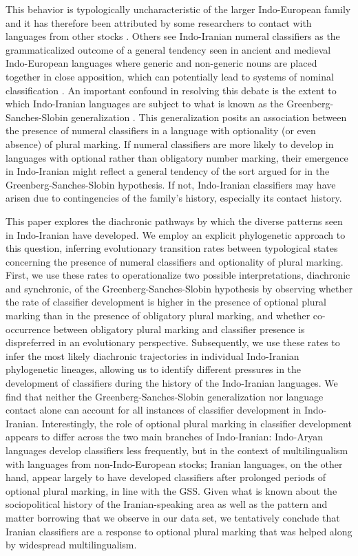\documentclass[11pt]{article}
\begin{document}
This behavior is typologically uncharacteristic of the larger Indo-European family and it has therefore been attributed by some researchers to contact with languages from other stocks \citep{Emeneau1956,Emeneau1965,Matisoff1978,ThomasonKaufman1988}.
Others see Indo-Iranian numeral classifiers as the grammaticalized outcome of a general tendency seen in ancient and medieval Indo-European languages where generic and non-generic nouns are placed together in close apposition, which can potentially lead to systems of nominal classification \citep{Hackstein2010}. An important confound in resolving this debate is the extent to which Indo-Iranian languages are subject to what is known as the Greenberg-Sanches-Slobin generalization \citep{Greenberg1972,SanchesSlobin1973}. This generalization posits an association between the presence of numeral classifiers in a language with optionality (or even absence) of plural marking. If numeral classifiers are more likely to develop in languages with optional rather than obligatory number marking, their emergence in Indo-Iranian might reflect a general tendency of the sort argued for in the Greenberg-Sanches-Slobin hypothesis. If not, Indo-Iranian classifiers may have arisen due to contingencies of the family's history, especially its contact history.

This paper explores the diachronic pathways by which the diverse patterns seen in Indo-Iranian have developed. 
We employ an explicit phylogenetic approach to this question, inferring evolutionary transition rates between typological states concerning the presence of numeral classifiers and optionality of plural marking. 
First, we use these rates to operationalize two possible interpretations, diachronic and synchronic, of the Greenberg-Sanches-Slobin hypothesis by observing whether the rate of classifier development is higher in the presence of optional plural marking than in the presence of obligatory plural marking, and whether co-occurrence between obligatory plural marking and classifier presence is dispreferred in an evolutionary perspective. 
Subsequently, we use these rates to infer the most likely diachronic trajectories in individual Indo-Iranian phylogenetic lineages, allowing us to identify different pressures in the development of classifiers during the history of the Indo-Iranian languages. 
We find that neither the Greenberg-Sanches-Slobin generalization nor language contact alone can account for all instances of classifier development in Indo-Iranian. 
Interestingly, the role of optional plural marking in classifier development appears to differ across the two main branches of Indo-Iranian: 
Indo-Aryan languages develop classifiers less frequently, but in the context of multilingualism with languages from non-Indo-European stocks; 
Iranian languages, on the other hand, appear largely to have developed classifiers after prolonged periods of optional plural marking, in line with the GSS. 
Given what is known about the sociopolitical history of the Iranian-speaking area as well as the pattern and matter borrowing \citep{MatrasSakel2007} that we observe in our data set, we tentatively conclude that Iranian classifiers are a response to optional plural marking that was helped along by widespread multilingualism. 
\end{document}
